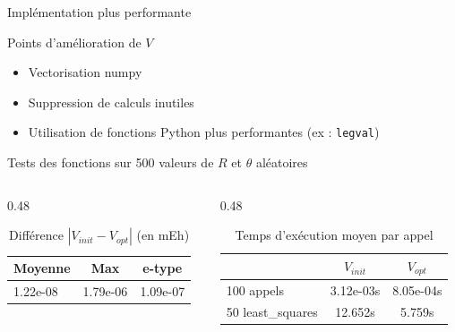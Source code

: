 \documentclass[10pt, aspectratio=169]{beamer}
\begin{document}
\begin{frame}{Implémentation plus performante}

  \begin{block}{Points d'amélioration de $V$}
    \begin{itemize}
      \item Vectorisation numpy
      \item Suppression de calculs inutiles
      \item Utilisation de fonctions Python plus performantes (ex : \texttt{legval})
    \end{itemize}
  \end{block}

  Tests des fonctions sur 500 valeurs de $R$ et $\theta$ aléatoires

  \begin{columns}[T]
    \begin{column}{0.48\textwidth}
        \begin{table}
        \caption{Différence $|V_{init} - V_{opt}|$ (en mEh)}\label{tab:diff}
          \begin{center}
            \begin{tabular}[c]{lll}
              \hline
              \multicolumn{1}{c}{Moyenne} & 
              \multicolumn{1}{c}{Max} &
              \multicolumn{1}{c}{e-type}\\
              \hline
              1.22e-08 & 1.79e-06 &1.09e-07\\
              \hline
            \end{tabular}
          \end{center}
        \end{table}
    \end{column}
 
    \begin{column}{0.48\textwidth}
      \begin{table}
        \caption{Temps d'exécution moyen par appel}\label{tab:temps}
        \begin{center}
          \begin{tabular}[c]{lcc}
            \hline
            \multicolumn{1}{c}{\textbf{}} & 
            \multicolumn{1}{c}{$V_{init}$} & 
            \multicolumn{1}{c}{$V_{opt}$} \\
            \hline
            100 appels & 3.12e-03s& 8.05e-04s\\
            50 least\_squares & 12.652s & 5.759s \\
            \hline
          \end{tabular}
        \end{center}
      \end{table}
    \end{column}
  \end{columns}
\end{frame}
\end{document}
